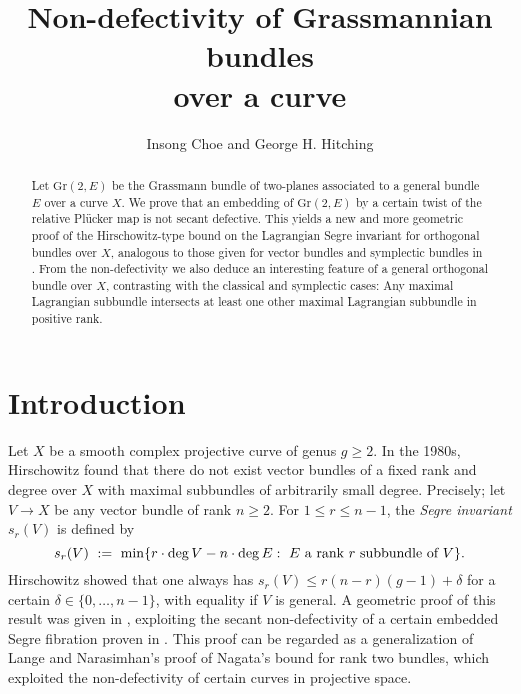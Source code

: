 \documentclass[10pt]{amsart}
\title[Non-defectivity of Grassmannian bundles]{Non-defectivity of Grassmannian bundles\\over a curve}
\author{Insong Choe and George H. Hitching}
\numberwithin{equation}{section}
\newcommand{\Gr}{\mathrm{Gr}}
\begin{document}
\thispagestyle{empty}

\begin{abstract} Let $\Gr(2, E)$ be the Grassmann bundle of two-planes associated to a general bundle $E$ over a curve $X$. We prove that an embedding of $\Gr(2, E)$ by a certain twist of the relative Pl\"ucker map is not secant defective. This yields a new and more geometric proof of the Hirschowitz-type bound on the Lagrangian Segre invariant for orthogonal bundles over $X$, analogous to those given for vector bundles and symplectic bundles in \cite{CH1, CH2}. From the non-defectivity we also deduce an interesting feature of a general orthogonal bundle over $X$, contrasting with the classical and symplectic cases: Any maximal Lagrangian subbundle intersects at least one other maximal Lagrangian subbundle in positive rank.
\end{abstract}

\maketitle

\section{Introduction}

Let $X$ be a smooth complex projective curve of genus $g \ge 2$. %
 In the 1980s, Hirschowitz \cite{Hir} found that there do not exist vector bundles of a fixed rank and degree over $X$ with maximal subbundles of arbitrarily small degree. Precisely; let $V \to X$ be any vector bundle of rank $n \ge 2$. For $1 \le r \le n-1$, the \textsl{Segre invariant} $s_r(V)$ is defined by
\[ s_r (V) \ := \ \min \{ r \cdot \deg V - n \cdot \deg E : \hbox{ $E$ a rank $r$ subbundle of $V$} \}. \]
Hirschowitz \cite[Th\'eor\`eme 4.4]{Hir} showed that one always has $s_r (V) \le r(n-r)(g-1) + \delta$ for a certain $\delta \in \{0 , \ldots , n-1 \}$, with equality if $V$ is general. A geometric proof of this result was given in \cite[\S 5]{CH1}, exploiting the secant non-defectivity of a certain embedded Segre fibration proven in \cite[Theorem 5.1]{CH1}. This proof can be regarded as a generalization of Lange and Narasimhan's proof \cite[\S 3]{LN} of Nagata's bound for rank two bundles, which exploited the non-defectivity of certain curves in projective space.
\end{document}
